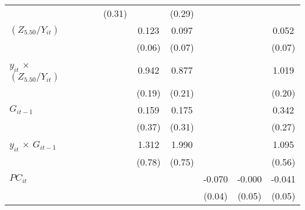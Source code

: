 \documentclass[12pt, a4paper]{article}
\begin{document}
\begin{appendices}
\begin{table}[htbp]
\begin{threeparttable}
{\begin{tabular}{l*{9}{c}}
				&                     &                     &                     &      (0.31)         &                     &      (0.29)         &                     &                     &                     \\
				$(Z_{5.50}/Y_{it})$          &                     &                     &                     &                     &       0.123\sym{*}  &       0.097         &                     &                     &       0.052         \\
				&                     &                     &                     &                     &      (0.06)         &      (0.07)         &                     &                     &      (0.07)         \\
				$y_{it}$ $\times$ $(Z_{5.50}/Y_{it})$&                     &                     &                     &                     &       0.942\sym{***}&       0.877\sym{***}&                     &                     &       1.019\sym{***}\\
				&                     &                     &                     &                     &      (0.19)         &      (0.21)         &                     &                     &      (0.20)         \\
				$G_{it-1}$            &                     &                     &                     &                     &       0.159         &       0.175         &                     &                     &       0.342         \\
				&                     &                     &                     &                     &      (0.37)         &      (0.31)         &                     &                     &      (0.27)         \\
				$y_{it}$ $\times$ $G_{it-1}$&                     &                     &                     &                     &       1.312         &       1.990\sym{*}  &                     &                     &       1.095         \\
				&                     &                     &                     &                     &      (0.78)         &      (0.75)         &                     &                     &      (0.56)         \\
				$PC_{it}$                &                     &                     &                     &                     &                     &                     &      -0.070         &      -0.000         &      -0.041         \\
				&                     &                     &                     &                     &                     &                     &      (0.04)         &      (0.05)         &      (0.05)         \\

\end{tabular}}
\end{threeparttable}
\end{table}
\end{appendices}
\end{document}
